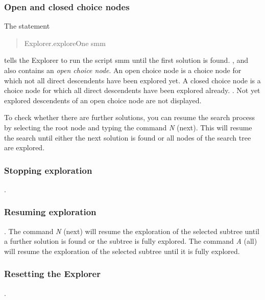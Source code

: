\documentclass[a4paper,halfparskip]{scrartcl}
\begin{document}
\subsubsection{Open and closed choice nodes}
The statement
\begin{quote}
Explorer.exploreOne smm
\end{quote}
tells the Explorer to run the script smm until the first solution is 
found. , and also
contains an \emph{open choice node}. An open choice node is a choice 
node for which not all direct descendents have been explored yet. A 
closed choice node is a choice node for which all direct descendents 
have been explored already. . Not yet 
explored descendents of an open choice node are not displayed.

To check whether there are further solutions, you can resume the 
search process by selecting the root node and typing the command \emph{N}
(next). This will resume the search until either the next solution 
is found or all nodes of the search tree are explored.

\subsubsection{Stopping exploration}
.

\subsubsection{Resuming exploration}
. The command \emph{N} (next) 
will resume the exploration of the selected subtree until a further 
solution is found or the subtree is fully explored. The command \emph{A}
(all) will resume the exploration of the selected subtree until it 
is fully explored.

\subsubsection{Resetting the Explorer}
.
\end{document}
